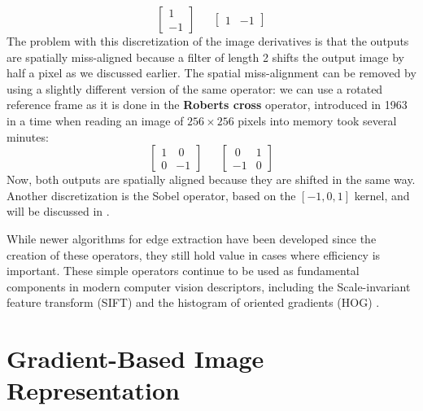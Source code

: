 \begin{equation}
	\begin{bmatrix}
		1 \\
		-1
	\end{bmatrix}
	~~~~~~~
	\begin{bmatrix}
		1 & -1
	\end{bmatrix}
\end{equation}
The problem with this discretization of the image derivatives is that the outputs are spatially miss-aligned because a filter of length 2 shifts the output image by half a pixel as we discussed earlier. The spatial miss-alignment can be removed by using a slightly different version of the same operator: we can use a rotated reference frame as it is done in the {\bf Roberts cross} operator, introduced in 1963 \cite{Roberts63} in a time when reading an image of $256 \times 256$ pixels into memory took several minutes:
\begin{equation}
	\begin{bmatrix}
		1 & ~0 \\
		0 & -1
	\end{bmatrix}
	~~~~~~~
	\begin{bmatrix}
		~0 & 1 \\
		-1 & 0
	\end{bmatrix}
\end{equation}
Now, both outputs are spatially aligned because they are shifted in the same way. Another discretization is the Sobel operator,
based on the $[-1,0,1]$ kernel, and will be discussed in \sect{\ref{sec:derivatives_binomial_filters}}.


While newer algorithms for edge extraction have been developed since the creation of these operators, they still hold value in cases where efficiency is important. These simple operators continue to be used as fundamental components in modern computer vision descriptors, including the Scale-invariant feature transform (SIFT) \cite{Lowe04} and the histogram of oriented gradients (HOG) \cite{Dalal2005}.

\section{Gradient-Based Image Representation}

